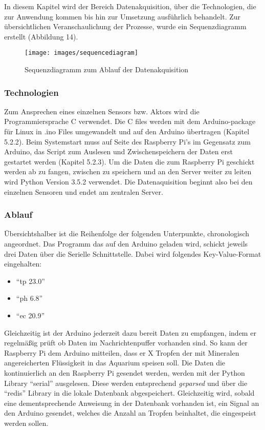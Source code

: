 \setcounter{page}{63}
In diesem Kapitel wird der Bereich Datenakquisition, über die Technologien, die zur Anwendung kommen bis hin zur Umsetzung ausführlich behandelt. Zur übersichtlichen Veranschaulichung der Prozesse, wurde ein Sequenzdiagramm erstellt (Abbildung 14). \\
\begin{figure}[hp]
	\centering
	\texttt{[image: images/sequencediagram]}
	\caption{Sequenzdiagramm zum Ablauf der Datenakquisition}
\end{figure}
\subsubsection{Technologien}
Zum Ansprechen eines einzelnen Sensors bzw. Aktors wird die Programmiersprache C verwendet. Die C files werden mit dem Arduino-package für Linux in .ino Files umgewandelt und auf den Arduino übertragen (Kapitel 5.2.2). Beim Systemstart muss auf Seite des Raspberry Pi's im Gegensatz zum Arduino, das Script zum Auslesen und Zwischenspeichern der Daten erst gestartet werden (Kapitel 5.2.3). Um die Daten die zum Raspberry Pi geschickt werden ab zu fangen, zwischen zu speichern und an den Server weiter zu leiten wird Python Version 3.5.2 verwendet.
Die Datenaquisition beginnt also bei den einzelnen Sensoren und endet am zentralen Server.
\newpage
\subsubsection{Ablauf}
Übersichtshalber ist die Reihenfolge der folgenden Unterpunkte, chronologisch angeordnet.
Das Programm das auf den Arduino geladen wird, schickt jeweils drei Daten über die Serielle Schnittstelle. Dabei wird folgendes Key-Value-Format eingehalten:
\begin{itemize}
    \item "`tp 23.0"'
    \item "`ph 6.8"'
    \item "`ec 20.9"'
\end{itemize}
Gleichzeitig ist der Arduino jederzeit dazu bereit Daten zu empfangen, indem er regelmäßig prüft ob Daten im Nachrichtenpuffer vorhanden sind. So kann der Raspberry Pi dem Arduino mitteilen, dass er X Tropfen der mit Mineralen angereicherten Flüssigkeit in das Aquarium speisen soll.  
Die Daten die kontinuierlich an den Raspberry Pi gesendet werden, werden mit der Python Library "`serial"' ausgelesen. Diese werden entsprechend \textit{geparsed} und über die "`redis"' Library in die lokale Datenbank abgespeichert. Gleichzeitig wird, sobald eine dementsprechende Anweisung in der Datenbank vorhanden ist, ein Signal an den Arduino gesendet, welches die Anzahl an Tropfen beinhaltet, die eingespeist werden sollen.

